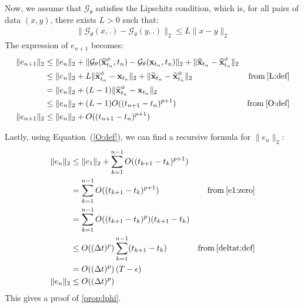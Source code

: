 \noindent Now, we assume that $\mathcal{G}_{\theta}$ satisfies the Lipschitz condition, which is, for all pairs of data $(x, y)$, there exists $L > 0$ such that:
\begin{align}
    \lVert \mathcal{G}_{\theta}(x, .) - \mathcal{G}_{\theta}(y, .)\rVert_2 \leq L\lVert x - y\rVert_2 \label{L:def}
\end{align}
\noindent The expression of $e_{n+1}$ becomes:
\begin{align}
    \lVert e_{n+1} \rVert_2 & \leq \lVert e_n \rVert_2 + \lVert \mathcal{G}_{\theta}(\widehat{\mathbf{x}}_{t_{n}}^{\phi}, t_{n}) - \mathcal{G}_{\theta}(\mathbf{x}_{t_n}, t_{n}) \rVert_2 + \lVert \widehat{\mathbf{x}}_{t_n}  - \widehat{\mathbf{x}}_{t_n}^{\phi}  \rVert_2 \\
    & \leq \lVert e_n \rVert_2 + L \lVert \widehat{\mathbf{x}}_{t_{n}}^{\phi} - \mathbf{x}_{t_n} \rVert_2 + \lVert \widehat{\mathbf{x}}_{t_n}  - \widehat{\mathbf{x}}_{t_n}^{\phi}  \rVert_2 & \text{from} \: \ref{L:def} \\
    & = \lVert e_n \rVert_2 + (L - 1) \lVert \widehat{\mathbf{x}}_{t_{n}}^{\phi} - \mathbf{x}_{t_n} \rVert_2 \label{en1:formula2} \\
     & \leq \lVert e_n \rVert_2 + (L - 1)O((t_{n+1} - t_n)^{p+1}) & \text{from} \: \ref{O:def} \\
    \lVert e_{n+1} \rVert_2 & \leq \lVert e_n \rVert_2 + O((t_{n+1} - t_n)^{p+1})
\end{align}

\noindent Lastly, using Equation~(\ref{O:def}), we can find a recursive formula for $\lVert e_{n} \rVert_2$:
\begin{align}
    \lVert e_{n} \rVert_2 & \leq \lVert e_1 \rVert_2 + \sum_{k=1}^{n-1} O((t_{k+1} - t_k)^{p+1}) \\
    & = \sum_{k=1}^{n-1} O((t_{k+1} - t_k)^{p+1}) & \text{from} \: \ref{e1:zero} \\
    & = \sum_{k=1}^{n-1} O((t_{k+1} - t_k)^{p})(t_{k+1} - t_k)\\
    & \leq O((\Delta t)^{p})\sum_{k=1}^{n-1}(t_{k+1} - t_k) & \text{from} \: \ref{deltat:def}  \\
    & = O((\Delta t)^{p})\left(T - \epsilon \right)\\
    \lVert e_{n} \rVert_2 & \leq O((\Delta t)^{p})\\
\end{align}
\noindent This gives a proof of \ref{prop:lphi}.